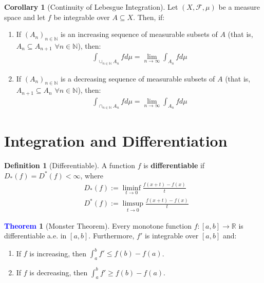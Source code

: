 \documentclass[11pt]{article}
\theoremstyle{definition}
\newcommand{\bb}[1]{\mathbb{#1}}
\newtheorem{theorem}{\textcolor{blue}{Theorem}}
\newtheorem{corollary}{Corollary}
\theoremstyle{definition}
\newtheorem{definition}{\textcolor{OliveGreen}{Definition}}
\theoremstyle{remark}
\begin{document}
\begin{corollary}[Continuity of Lebesgue Integration] 
Let $(X, \mathcal{F}, \mu)$ be a measure space and let $f$ be integrable over $A \subseteq X$. Then, if: 
\begin{enumerate}[noitemsep]
	\item If $(A_n)_{n \in \bb{N}}$ is an increasing sequence of measurable subsets of $A$ (that is, $A_n \subseteq  A_{n +1}$ $\forall n \in \bb{N}$), then: 
	\begin{align*}
		\int_{ \cup_{n \in \bb{N}} A_n} f d \mu  = \lim_{n \rightarrow \infty } \int_{A_n} f d \mu 
	\end{align*}
	\item If $(A_n)_{n \in \bb{N}}$ is a decreasing sequence of measurable subsets of $A$ (that is, $A_{n+1} \subseteq  A_{n}$ $\forall n \in \bb{N}$), then:
	\begin{align*}
		\int_{ \cap_{n \in \bb{N}} A_n} f d \mu  = \lim_{n \rightarrow \infty } \int_{A_n} f d \mu 
	\end{align*}
\end{enumerate}
\end{corollary}

\section{Integration and Differentiation}

\begin{definition}[Differentiable]
	A function $f$ is \textbf{differentiable} if $D_*(f) = D^*(f) < \infty$, where
	\begin{align*}
		& D_*(f) := \liminf_{t \rightarrow 0} \frac{f(x+t) - f(x)}{t} \\
		& D^*(f) := \limsup_{t \rightarrow 0} \frac{f(x+t) - f(x)}{t} 
	\end{align*}
\end{definition}


\begin{theorem}[Monster Theorem]
	Every monotone function $f: [a, b] \rightarrow \bb{R}$ is differentiable a.e. in $[a,b]$. Furthermore, $f'$ is integrable over $[a,b]$ and: 
\begin{enumerate}[noitemsep]
	\item If $f$ is increasing, then $\int_a^b f' \leq f(b) - f(a)$. 
	\item If $f$ is decreasing, then $\int_a^b f' \geq f(b) - f(a)$. 
\end{enumerate}
\end{theorem}
\end{document}
